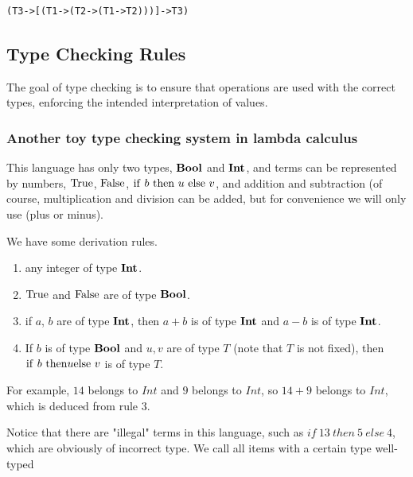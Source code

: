 \documentclass[a4paper]{exam}
\begin{document}
\begin{enumerate}
        \begin{solution}
\begin{verbatim}
(T3->[(T1->(T2->(T1->T2)))]->T3)
\end{verbatim}
        \end{solution}

\end{enumerate}

\subsection{Type Checking Rules}
The goal of type checking is to ensure that operations are used with the correct types, enforcing the intended interpretation of values.

\subsubsection{Another toy type checking system in lambda calculus}

This language has only two types, ${\bf Bool}$ and ${\bf Int}$, and terms can be represented by numbers, ${\rm True}$, ${\rm False}$, ${\rm if}\ b\ {\rm then}\ u \ {\rm else}\ v$, and addition and subtraction (of course, multiplication and division can be added, but for convenience we will only use (plus or minus).

We have some derivation rules.

\begin{enumerate}
  \item any integer of type ${\bf Int}$.
  \item ${\rm True}$ and ${\rm False}$ are of type ${\bf Bool}$.
  \item if $a$, $b$ are of type ${\bf Int}$, then $a+b$ is of type ${\bf Int}$ and $a-b$ is of type ${\bf Int}$.
  \item If $b$ is of type ${\bf Bool}$ and $u,v$ are of type $T$ (note that $T$ is not fixed), then ${\rm if}\ b\ {\rm then}\\ u {\rm else}\ v$ is of type $T$.
\end{enumerate}

For example, $14$ belongs to ${ Int}$ and $9$ belongs to ${ Int}$, so $14+9$ belongs to ${Int}$, which is deduced from rule 3.

Notice that there are "illegal" terms in this language, such as ${ if}\ 13\ { then}\ 5\ { else}\ 4$, which are obviously of incorrect type. We call all items with a certain type well-typed
\end{document}
